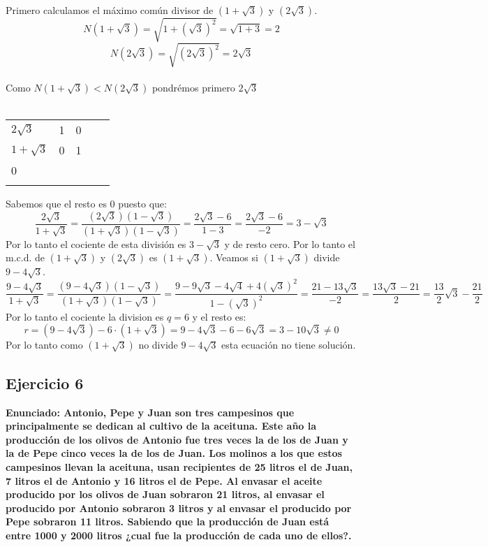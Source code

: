 \documentclass[11pt, a4paper, titlepage]{article}
\begin{document}
Primero calculamos el máximo común divisor de $(1 + \sqrt 3)$ y $(2\sqrt3)$.\\
$$ N(1 + \sqrt3) = \sqrt{1 + {(\sqrt3)}^{2}} = \sqrt{1 + 3} = 2 $$
$$ N(2 \sqrt 3) = \sqrt{{(2\sqrt3)}^{2}} =  2\sqrt3 $$\\
Como $N(1 + \sqrt3) < N(2 \sqrt 3)$ pondrémos primero $2 \sqrt3$\\ \\
\begin{tabular}{lllll}
\multicolumn{1}{l|}{$2\sqrt3$}    & 1 & 0 &  &  \\
\multicolumn{1}{l|}{$1 + \sqrt3$} & 0 & 1 &  &  \\
\multicolumn{1}{l|}{0} &   &   &  &  \\
                                &   &   &  & 
\end{tabular}

Sabemos que el resto es 0 puesto que:\\
$$ \frac{2 \sqrt3}{1 + \sqrt3} = \frac{(2\sqrt3)(1 - \sqrt3)}{(1 + \sqrt3)(1 - \sqrt3)} = \frac{2 \sqrt3 - 6}{1 - 3} = \frac{2\sqrt3 - 6}{-2} = 3 - \sqrt3 $$
Por lo tanto el cociente de esta división es $ 3 - \sqrt3 $ y de resto cero. Por lo tanto el m.c.d. de $(1 + \sqrt 3)$ y $(2\sqrt3)$ es $(1 + \sqrt 3)$. Veamos si $(1 + \sqrt 3)$ divide $ 9 -4 \sqrt3$.\\
$$ \frac{9 - 4\sqrt3}{1 + \sqrt3} = \frac{(9 - 4\sqrt3)(1 - \sqrt3)}{(1 + \sqrt3)(1 - \sqrt3)} = \frac{9 - 9\sqrt3 - 4\sqrt4 + 4{(\sqrt3)}^{2}}{1 - {(\sqrt3)}^{2} } = \frac{21 -13\sqrt3}{-2} = \frac{13\sqrt3 - 21}{2} = \frac{13}{2}\sqrt3 - \frac{21}{2}$$
Por lo tanto el cociente la division es $q = 6$ y el resto es: \\
$$r = (9 -4\sqrt3) - 6 \cdot (1 + \sqrt3) = 9 -4\sqrt3 - 6 -6\sqrt3 = 3 - 10\sqrt{3} \neq 0$$ 
Por lo tanto como $(1 + \sqrt 3)$ no divide $ 9 -4 \sqrt3$ esta ecuación no tiene solución.



\subsection{\LARGE{Ejercicio 6}}
\textbf{Enunciado: Antonio, Pepe y Juan son tres campesinos que principalmente se
dedican al cultivo de la aceituna. Este año la producción de los olivos de
Antonio fue tres veces la de los de Juan y la de Pepe cinco veces la de los
de Juan. Los molinos a los que estos campesinos llevan la aceituna, usan
recipientes de 25 litros el de Juan, 7 litros el de Antonio y 16 litros el de
Pepe. Al envasar el aceite producido por los olivos de Juan sobraron 21
litros, al envasar el producido por Antonio sobraron 3 litros y al envasar el
producido por Pepe sobraron 11 litros. Sabiendo que la producción de Juan
está entre 1000 y 2000 litros ¿cual fue la producción de cada uno de ellos?.}
\end{document}
